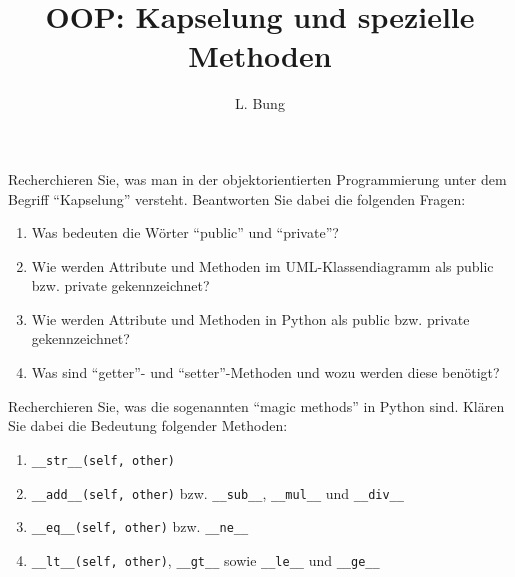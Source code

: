 \documentclass[11pt, a4paper, oneside]{article}
\begin{document}
	\author{L. Bung}
	\title{OOP: Kapselung und\hspace{10cm} spezielle Methoden}
	\subject{SAE}
	\maketitle
	
	
	Recherchieren Sie, was man in der objektorientierten Programmierung unter dem Begriff ``Kapselung'' versteht.
	Beantworten Sie dabei die folgenden Fragen:
	\begin{enumerate}[label=\alph*)]
		\item Was bedeuten die Wörter ``public'' und ``private''?\\[1cm]\lines[2cm]
		\item Wie werden Attribute und Methoden im UML-Klassendiagramm als public bzw. private gekennzeichnet?\\[1cm]\lines[2cm]
		\item Wie werden Attribute und Methoden in Python als public bzw. private gekennzeichnet?\\[1cm]\lines[2cm]
		\item Was sind ``getter''- und ``setter''-Methoden und wozu werden diese benötigt?\\[1cm]\lines[2cm]
	\end{enumerate}
	
	\pagebreak

	
	Recherchieren Sie, was die sogenannten ``magic methods'' in Python sind.
	Klären Sie dabei die Bedeutung folgender Methoden:
	\begin{enumerate}[label=\alph*)]
		\item \texttt{\_\_str\_\_(self, other)}\\[1cm]\lines[2cm]
		\item \texttt{\_\_add\_\_(self, other)} bzw. \texttt{\_\_sub\_\_}, \texttt{\_\_mul\_\_} und \texttt{\_\_div\_\_}\\[1cm]\lines[2cm]
		\item \texttt{\_\_eq\_\_(self, other)} bzw. \texttt{\_\_ne\_\_}\\[1cm]\lines[2cm]
		\item \texttt{\_\_lt\_\_(self, other)}, \texttt{\_\_gt\_\_} sowie \texttt{\_\_le\_\_} und \texttt{\_\_ge\_\_}\\[1cm]\lines[2cm]
	\end{enumerate}
\end{document}
